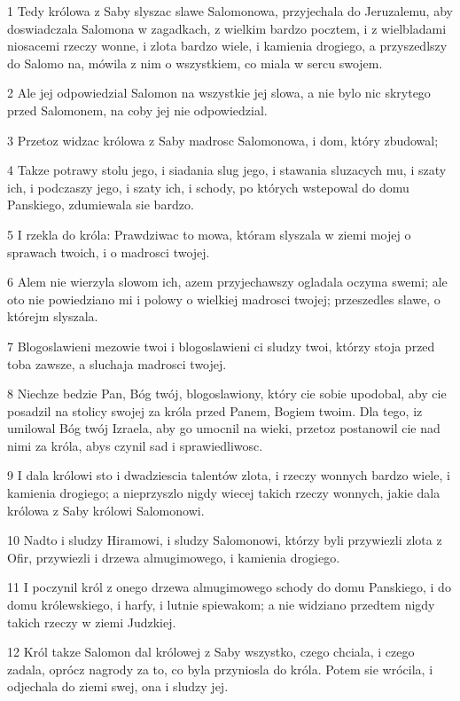 \par 1 Tedy królowa z Saby slyszac slawe Salomonowa, przyjechala do Jeruzalemu, aby doswiadczala Salomona w zagadkach, z wielkim bardzo pocztem, i z wielbladami niosacemi rzeczy wonne, i zlota bardzo wiele, i kamienia drogiego, a przyszedlszy do Salomo na, mówila z nim o wszystkiem, co miala w sercu swojem.
\par 2 Ale jej odpowiedzial Salomon na wszystkie jej slowa, a nie bylo nic skrytego przed Salomonem, na coby jej nie odpowiedzial.
\par 3 Przetoz widzac królowa z Saby madrosc Salomonowa, i dom, który zbudowal;
\par 4 Takze potrawy stolu jego, i siadania slug jego, i stawania sluzacych mu, i szaty ich, i podczaszy jego, i szaty ich, i schody, po których wstepowal do domu Panskiego, zdumiewala sie bardzo.
\par 5 I rzekla do króla: Prawdziwac to mowa, któram slyszala w ziemi mojej o sprawach twoich, i o madrosci twojej.
\par 6 Alem nie wierzyla slowom ich, azem przyjechawszy ogladala oczyma swemi; ale oto nie powiedziano mi i polowy o wielkiej madrosci twojej; przeszedles slawe, o którejm slyszala.
\par 7 Blogoslawieni mezowie twoi i blogoslawieni ci sludzy twoi, którzy stoja przed toba zawsze, a sluchaja madrosci twojej.
\par 8 Niechze bedzie Pan, Bóg twój, blogoslawiony, który cie sobie upodobal, aby cie posadzil na stolicy swojej za króla przed Panem, Bogiem twoim. Dla tego, iz umilowal Bóg twój Izraela, aby go umocnil na wieki, przetoz postanowil cie nad nimi za króla, abys czynil sad i sprawiedliwosc.
\par 9 I dala królowi sto i dwadziescia talentów zlota, i rzeczy wonnych bardzo wiele, i kamienia drogiego; a nieprzyszlo nigdy wiecej takich rzeczy wonnych, jakie dala królowa z Saby królowi Salomonowi.
\par 10 Nadto i sludzy Hiramowi, i sludzy Salomonowi, którzy byli przywiezli zlota z Ofir, przywiezli i drzewa almugimowego, i kamienia drogiego.
\par 11 I poczynil król z onego drzewa almugimowego schody do domu Panskiego, i do domu królewskiego, i harfy, i lutnie spiewakom; a nie widziano przedtem nigdy takich rzeczy w ziemi Judzkiej.
\par 12 Król takze Salomon dal królowej z Saby wszystko, czego chciala, i czego zadala, oprócz nagrody za to, co byla przyniosla do króla. Potem sie wrócila, i odjechala do ziemi swej, ona i sludzy jej.
